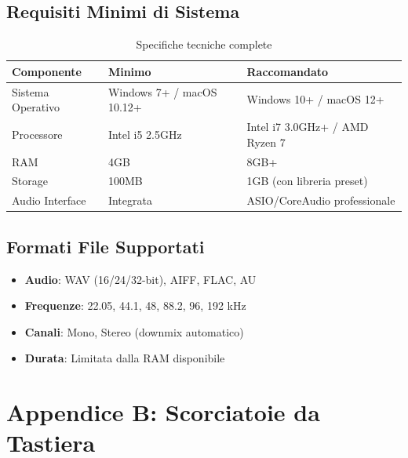 \documentclass[a4paper,11pt,openany]{book}
\begin{document}
\subsection*{Requisiti Minimi di Sistema}

\begin{table}[H]
    \centering
    \caption{Specifiche tecniche complete}
    \label{tab:tech_specs}
    \begin{tabular}{@{}p{4cm}p{3cm}p{6cm}@{}}
        \toprule
        \textbf{Componente} & \textbf{Minimo} & \textbf{Raccomandato} \\
        \midrule
        Sistema Operativo & Windows 7+ / macOS 10.12+ & Windows 10+ / macOS 12+ \\
        Processore & Intel i5 2.5GHz & Intel i7 3.0GHz+ / AMD Ryzen 7 \\
        RAM & 4GB & 8GB+ \\
        Storage & 100MB & 1GB (con libreria preset) \\
        Audio Interface & Integrata & ASIO/CoreAudio professionale \\
        \bottomrule
    \end{tabular}
\end{table}

\subsection*{Formati File Supportati}

\begin{itemize}
    \item \textbf{Audio}: WAV (16/24/32-bit), AIFF, FLAC, AU
    \item \textbf{Frequenze}: 22.05, 44.1, 48, 88.2, 96, 192 kHz
    \item \textbf{Canali}: Mono, Stereo (downmix automatico)
    \item \textbf{Durata}: Limitata dalla RAM disponibile
\end{itemize}

\section*{Appendice B: Scorciatoie da Tastiera}
\end{document}
